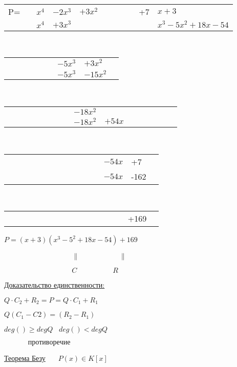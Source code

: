 \documentclass[a4paper,12pt]{article}
\theoremstyle{plain}
\begin{document}
	\begin{tabular}{rr@{}l@{}l@{}l@{}rrrl@{}l|l} P=&&$x^4$&$-2x^3$&$+3x^2$&&&&&+7&$x+3$\\ \cline{2--2}\cline{11--11} &&$x^4$&$+3x^3$&&&&&&&$x^3-5x^2+18x-54$\\ \cline{3--3} \cline{4--9}
	\end{tabular}\\
	\begin{tabular}{rrrrrr@{}l@{}l@{}l}
	&&&&&&$-5x^3$&$+3x^2$&\\
	\cline{6--6}
	&&&&&&$-5x^3$&$-15x^2$&\\ \cline{7--7}
	\cline{8--13}
	\end{tabular}\\
	\begin{tabular}{rrrrrrrr@{}l@{}l@{}l@{}l@{}l@{}l@{}l@{}l}
	&&&&&&&&$-18x^2$&&&&&&&\\ 
	\cline{8--8}
	&&&&&&&&$-18x^2$&$+54x$&&&&&&\\ \cline{9--10}
	\cline{10--15}
	\end{tabular}\\
	\begin{tabular}{rrrrrrrr@{}r@{}rl@{}l@{}l}
	&&&&&&&&$\;\;\;\;\;\;$&&$-54x$&+7&\\ \cline{10--10}
	&&&&&&&&$\;\;\;\;\;\;$&&$-54x$&-162&\\ \cline{11--17} \cline{12--17}
	\cline{13--21}
	\end{tabular}\\
	\begin{tabular}{rrrrrrrr@{}r@{}rl@{}l@{}l}
	&&&&&&&&$\;\;\;\;\;\;\;\;\;\;\;\;\;$&&&+169&\\ 
	\end{tabular}
	
$P=(x+3)(x^3-5^2+18x-54)+169$

$\;\;\;\;\;\;\;\;\;\;\;\;\;\;\;\;\;\;\;\;\;\;\;\;\;\;\;\;\;\;\;\;\;\;\parallel\;\;\;\;\;\;\;\;\;\;\;\;\;\;\;\;\;\;\;\;\parallel$

$\;\;\;\;\;\;\;\;\;\;\;\;\;\;\;\;\;\;\;\;\;\;\;\;\;\;\;\;\;\;\;\;\;\;C\;\;\;\;\;\;\;\;\;\;\;\;\;\;\;\;\;\;R$

\underline{Доказательство единственности:}

$Q \cdot C_{2}+R_{2}=P=Q \cdot C_{1} + R_{1}$

$Q(C_{1}-C{2})=(R_{2}-R_{1})$

$deg()\geqslant degQ \; \; \; deg()<degQ$

$\;\;\;\;\;\;\;\;\;\;\;\;противоречие$

\underline{Теорема Безу} $\;\;\;\;$ $P(x) \in K[x]$
\end{document}
